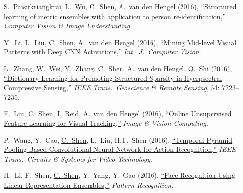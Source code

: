 \documentclass[9pt, a4paper]{article}
\newcommand{\years}[1]{\marginnote{\scriptsize #1}}
\def\highlight{\uline}
\begin{document}
\years{2016} S.~Paisitkriangkrai, L.~Wu, \highlight{C.~Shen}, A.~van den Hengel (2016),
\href{http://www.google.com/search?lr=&ie=UTF-8&oe=UTF-8&q=Structured+learning+of+metric+ensembles+with+application+to+person+re-identification+Sakrapee+Paisitkriangkrai%2C+Lin+Wu%2C+Chunhua+Shen%2C+Anton+van+den+Hengel}{``Structured learning of metric ensembles with application to person re-identification,{}''}
\emph{Computer Vision \& Image Understanding}.

\medskip

\years{2016} Y.~Li, L.~Liu, \highlight{C.~Shen}, A.~van den Hengel (2016),
\href{http://www.google.com/search?lr=&ie=UTF-8&oe=UTF-8&q=Mining+Mid-level+Visual+Patterns+with+Deep+CNN+Activations+Yao+Li%2C+Lingqiao+Liu%2C+Chunhua+Shen%2C+Anton+van+den+Hengel}{``Mining Mid-level Visual Patterns with Deep {CNN} Activations,{}''}
\emph{Int.\ J.\  Computer Vision}.

\medskip

\years{2016} L.~Zhang, W.~Wei, Y.~Zhang, \highlight{C.~Shen}, A.~van den Hengel, Q.~Shi (2016),
\href{http://www.google.com/search?lr=&ie=UTF-8&oe=UTF-8&q=Dictionary+Learning+for+Promoting+Structured+Sparsity+in+Hyerpsectral+Compressive+Sensing+Lei+Zhang%2C+Wei+Wei%2C+Yanning+Zhang%2C+Chunhua+Shen%2C+Anton+van+den+Hengel%2C+Qinfeng+Shi}{``Dictionary Learning for Promoting Structured Sparsity in Hyerpsectral Compressive Sensing,{}''}
\emph{IEEE Trans.\  Geoscience \& Remote Sensing}, 54: 7223--7235.

\medskip

\years{2016} F.~Liu, \highlight{C.~Shen}, I.~Reid, A.~van den Hengel (2016),
\href{http://www.google.com/search?lr=&ie=UTF-8&oe=UTF-8&q=Online+Unsupervised+Feature+Learning+for+Visual+Tracking+Fayao+Liu%2C+Chunhua+Shen%2C+Ian+Reid%2C+Anton+van+den+Hengel}{``Online Unsupervised Feature Learning for Visual Tracking,{}''}
\emph{Image \& Vision Computing}.

\medskip

\years{2016} P.~Wang, Y.~Cao, \highlight{C.~Shen}, L.~Liu, H.T.~Shen (2016),
\href{http://www.google.com/search?lr=&ie=UTF-8&oe=UTF-8&q=Temporal+Pyramid+Pooling+Based+Convolutional+Neural+Network+for+Action+Recognition+Peng+Wang%2C+Yuanzhouhan+Cao%2C+Chunhua+Shen%2C+Lingqiao+Liu%2C+Heng+Tao+Shen}{``Temporal Pyramid Pooling Based Convolutional Neural Network for Action Recognition,{}''}
\emph{IEEE Trans.\  Circuits \& Systems for Video Technology}.

\medskip

\years{2016} H.~Li, F.~Shen, \highlight{C.~Shen}, Y.~Yang, Y.~Gao (2016),
\href{http://www.google.com/search?lr=&ie=UTF-8&oe=UTF-8&q=Face+Recognition+Using+Linear+Representation+Ensembles+Hanxi+Li%2C+Fumin+Shen%2C+Chunhua+Shen%2C+Yang+Yang%2C+Yongsheng+Gao}{``Face Recognition Using Linear Representation Ensembles,{}''}
\emph{Pattern Recognition}.
\end{document}
